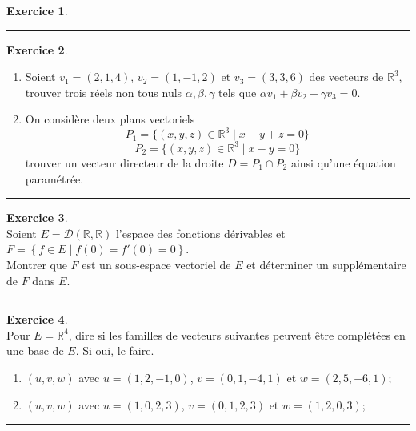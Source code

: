\documentclass[a4paper,10pt]{article}
\theoremstyle{definition}
\theoremstyle{definition}
\newtheorem{exo}{Exercice}
\newcommand{\R}{\mathbb{R}}
\begin{document}
\begin{minipage}{1\linewidth}
\begin{minipage}[t]{0.48\linewidth}
\begin{exo}
		\centering
		\rule{1\linewidth}{0.6pt}
	\end{exo}
	
		
	
	\end{minipage}	
	\hfill\vrule\hfill
	\begin{minipage}[t]{0.48\linewidth}
		\raggedright
		
	\begin{exo}\quad\\
		\begin{enumerate}
			\item Soient $v_1=(2,1,4)$, $v_2=(1,-1,2)$ et $v_3=(3,3,6)$ des vecteurs de $\R^3$, 
			trouver trois r\'eels non tous nuls $\alpha,\beta,\gamma$ tels que $\alpha v_1+ \beta v_2 + \gamma v_3=0$.
			
			\item On considère deux plans vectoriels
			$$P_1=\{(x,y,z) \in \R^3 \mid x-y+z=0\}$$
			$$P_2=\{(x,y,z) \in \R^3 \mid x-y=0\}$$
			trouver un vecteur directeur de la droite $D=P_1\cap P_2$ ainsi qu'une \'equation param\'etr\'ee.
		\end{enumerate}
		
		\centering
		\rule{1\linewidth}{0.6pt}
	\end{exo}

\begin{exo}\quad\\
	Soient $E = \mathcal{D} (\R, \R)$ l'espace des fonctions dérivables
	et $F = \left\{ f \in E \mid f (0) = f' (0) = 0\right\}$.\\[0.25cm] Montrer que $F$
	est un sous-espace vectoriel de $E$ et d\'eterminer un
	suppl\'ementaire de $F$ dans $E$.
	
	\centering
	\rule{1\linewidth}{0.6pt}
\end{exo}

\begin{exo}\quad\\
	Pour $E=\R^4$, dire si les familles de vecteurs suivantes peuvent être complétées en une base de $E$. Si oui, le faire. 
	\begin{enumerate}
		\item $(u,v,w)$ avec $u=(1,2,-1,0)$, $v=(0,1,-4,1)$ et $w=(2,5,-6,1)$;
		\item $(u,v,w)$ avec $u=(1,0,2,3)$, $v=(0,1,2,3)$ et $w=(1,2,0,3)$;
	\end{enumerate}

	
	\centering
	\rule{1\linewidth}{0.6pt}
\end{exo}



\end{minipage}
\end{minipage}
\end{document}
